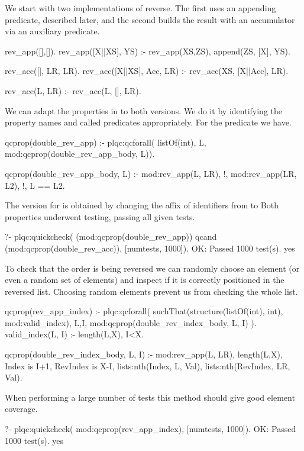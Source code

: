 We start with two implementations of reverse.
%
The first uses an appending predicate, described later, and the second
builds the result with an accumulator via an auxiliary predicate.
%
\begin{yapcode}
 rev_app([],[]).
 rev_app([X||XS], YS) :-
   rev_app(XS,ZS), append(ZS, [X], YS).

 rev_acc([], LR, LR).
 rev_acc([X||XS], Acc, LR) :-
   rev_acc(XS, [X||Acc], LR).

 rev_acc(L, LR) :-
   rev_acc(L, [], LR).
\end{yapcode}


We can adapt the properties in  to both versions.
%
We do it by identifying the property names and called predicates
appropriately.
%
For the  predicate we have.
\begin{yapcode}
 qcprop(double_rev_app) :-
   plqc:qcforall( listOf(int), L,
     mod:qcprop({double_rev_app_body, L})).

 qcprop({double_rev_app_body, L}) :- 
   mod:rev_app(L, LR),
   !, %
   mod:rev_app(LR, L2), !, L == L2.
\end{yapcode}
%
The version for  is obtained by changing the affix of
identifiers from  to 
%
Both properties underwent testing, passing all given tests.
%
\begin{yapcode}
   ?- plqc:quickcheck(
          (mod:qcprop(double_rev_app))
        qcand (mod:qcprop(double_rev_acc)),
          [{numtests, 1000}]).
 OK: Passed 1000 test(s).
 yes
\end{yapcode}


To check that the order is being reversed we can randomly choose an
element (or even a random set of elements) and inspect if it is
correctly positioned in the reversed list.
%
Choosing random elements prevent us from checking the whole list.
%
\begin{yapcode}
 qcprop(rev_app_index) :-
   plqc:qcforall(
     suchThat(structure({listOf(int), int}),
       mod:valid_index),
     {L,I},
     mod:qcprop({double_rev_index_body, L, I})
   ).
 valid_index({L, I}) :-
   length(L,X), I<X.

 qcprop({double_rev_index_body, L, I}) :- 
   mod:rev_app(L, LR),
   length(L,X),
   Index is I+1, RevIndex is X-I,
   lists:nth(Index, L, Val),
   lists:nth(RevIndex, LR, Val).
\end{yapcode}
%
When performing a large number of tests this method should give good
element coverage.
%
\begin{yapcode}
   ?- plqc:quickcheck(
        mod:qcprop(rev_app_index),
        [{numtests, 1000}]).
 OK: Passed 1000 test(s).
 yes
\end{yapcode}


